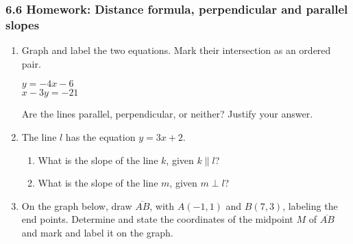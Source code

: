 

\fancyhead[LE]{\thepage}



\subsubsection*{6.6 Homework: Distance formula, perpendicular and parallel slopes}
\begin{enumerate}
  \item Graph and label the two equations. Mark their intersection as an ordered pair.

  \begin{multicols}{2}
    $y = -4x-6$ \\
    $x-3y = -21$
  \end{multicols}  \vspace{1cm}
  Are the lines parallel, perpendicular, or neither? Justify your answer.
  \vspace{1.5cm}

  \begin{center} %
  \end{center}

\item The line $l$ has the equation $y= 3x+2$.
\begin{enumerate}
  \item What is the slope of the line $k$, given $k \parallel l$?
  \vspace{1cm}
  \item What is the slope of the line $m$, given $m \perp l$?
  \vspace{1cm}
\end{enumerate}

\newpage
\item On the graph below, draw $\overline{AB}$, with $A(-1,1)$ and $B(7,3)$, labeling the end points. Determine and state the coordinates of the midpoint $M$ of $\overline{AB}$ and mark and label it on the graph.\\


\end{enumerate}
